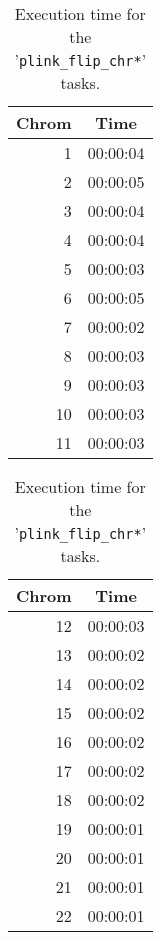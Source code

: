 \documentclass[10pt,twoside,english]{scrartcl}
\begin{document}
\begin{table}[H]
\protect\caption{Execution time for the '\texttt{plink\_flip\_chr*}' tasks.\label{tab:plink_flip_exec_time}}

\centering

\begin{tabular}{rr}
\hline 
\multicolumn{1}{c}{\textbf{Chrom}}
 & \multicolumn{1}{c}{\textbf{Time}}
\\
\hline 

1 & {\color{light_gray}00:00:0}4\\
2 & {\color{light_gray}00:00:0}5\\
3 & {\color{light_gray}00:00:0}4\\
4 & {\color{light_gray}00:00:0}4\\
5 & {\color{light_gray}00:00:0}3\\
6 & {\color{light_gray}00:00:0}5\\
7 & {\color{light_gray}00:00:0}2\\
8 & {\color{light_gray}00:00:0}3\\
9 & {\color{light_gray}00:00:0}3\\
10 & {\color{light_gray}00:00:0}3\\
11 & {\color{light_gray}00:00:0}3\\
\hline 
\end{tabular}
\hspace{1cm}
\begin{tabular}{rr}
\hline 
\multicolumn{1}{c}{\textbf{Chrom}}
 & \multicolumn{1}{c}{\textbf{Time}}
\\
\hline 

12 & {\color{light_gray}00:00:0}3\\
13 & {\color{light_gray}00:00:0}2\\
14 & {\color{light_gray}00:00:0}2\\
15 & {\color{light_gray}00:00:0}2\\
16 & {\color{light_gray}00:00:0}2\\
17 & {\color{light_gray}00:00:0}2\\
18 & {\color{light_gray}00:00:0}2\\
19 & {\color{light_gray}00:00:0}1\\
20 & {\color{light_gray}00:00:0}1\\
21 & {\color{light_gray}00:00:0}1\\
22 & {\color{light_gray}00:00:0}1\\
\hline 
\end{tabular}


\end{table}
\end{document}
